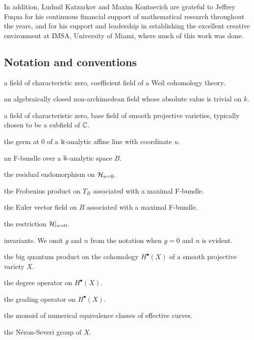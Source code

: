 \documentclass[twoside,leqno]{article}
\numberwithin{equation}{section}
\theoremstyle{plain}
\theoremstyle{definition}
\begin{document}
In addition, Ludmil Katzarkov and Maxim Kontsevich are grateful to Jeffrey Fuqua for his continuous financial support of mathematical research throughout the years, and for his support and leadership in establishing the excellent creative environment at IMSA, University of Miami, where much of this work was done.

\subsection*{Notation and conventions} 

\begin{description}[style=multiline, leftmargin=7.5em, labelwidth=7em, align=left, itemsep=0pt]
\item[$k$] a field of characteristic zero, coefficient field of a Weil cohomology theory.
\item[$\bbk \supset k$] an algebraically closed non-archimedean field whose absolute value is trivial on $k$.
\item[$\kay$] a field of characteristic zero, base field of smooth projective varieties, typically chosen to be a subfield of $\mathbb C$.
\item[$\bbD$] the germ at $0$ of a $\Bbbk$-analytic affine line with coordinate $u$.
\item[$(\cH, \nabla)/B$] an F-bundle over a $\Bbbk$-analytic space $B$.
\item[$\bkappa = \nabla_{u^{2}\partial_{u}}|_{\cH_{u=0}}$] the residual endomorphism on $\mathcal H_{u=0}$.
\item[$\fp$] the Frobenius product on $T_{B}$ associated with a maximal F-bundle.
\item[$\Eu$] the Euler vector field on $B$ associated with a maximal F-bundle.
\item[$\cH_{o}$] the restriction $\mathcal H|_{u = 0}$.
\item[$\braket{\gamma_1\cdots \gamma_n}_{g,n,\beta}$] \GW invariants.
We omit $g$ and $n$ from the notation when $g=0$ and $n$ is evident.
\item[$\qup$] the big quantum product on the cohomology $H^\bullet(X)$ of a smooth projective variety $X$.
\item[$\Deg$] the degree operator on $H^{\bullet}(X)$.
\item[$\Gr$] the grading operator on $H^{\bullet}(X)$.
\item[$\NE(X,\bbZ)$] the monoid of numerical equivalence classes of effective curves.
\item[$\NS(X,\bbZ)$] the N\'{e}ron-Severi group of $X$.

\end{description}
\end{document}
